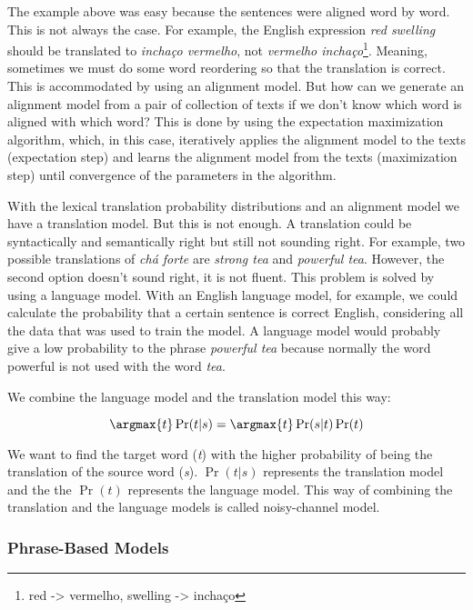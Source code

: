 The example above was easy because the sentences were aligned word by word. This is not always the case. For example, the English expression \textit{red swelling} should be translated to \textit{inchaço vermelho}, not \textit{vermelho inchaço}\footnote{red -> vermelho, swelling -> inchaço}. Meaning, sometimes we must do some word reordering so that the translation is correct. This is accommodated by using an alignment model. But how can we generate an alignment model from a pair of collection of texts if we don't know which word is aligned with which word? This is done by using the expectation maximization algorithm, which, in this case, iteratively applies the alignment model to the texts (expectation step) and learns the alignment model from the texts (maximization step) until convergence of the parameters in the algorithm. 

With the lexical translation probability distributions and an alignment model we have a translation model. But this is not enough. A translation could be syntactically and semantically right but still not sounding right. For example, two possible translations of \textit{chá forte} are \textit{strong tea} and \textit{powerful tea}. However, the second option doesn't sound right, it is not fluent. This problem is solved by using a language model. With an English language model, for example, we could calculate the probability that a certain sentence is correct English, considering all the data that was used to train the model. A language model would probably give a low probability to the phrase \textit{powerful tea} because normally the word powerful is not used with the word \textit{tea}.

We combine the language model and the translation model this way:

\begin{equation}
\argmax{t} \Pr(t|s) = \argmax{t} \Pr(s|t) \Pr(t)
\end{equation}


We want to find the target word (\textit{t}) with the higher probability of being the translation of the source word (\textit{s}). $\Pr(t|s)$ represents the translation model and the the $\Pr(t)$ represents the language model. This way of combining the translation and the language models is called noisy-channel model.  

\subsubsection{Phrase-Based Models}


